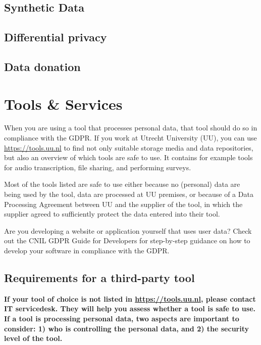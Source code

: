 \documentclass[
]{book}
\begin{document}
\hypertarget{synthetic-data}{%
\section{Synthetic Data}\label{synthetic-data}}

\hypertarget{differential-privacy}{%
\section{Differential privacy}\label{differential-privacy}}

\hypertarget{data-donation}{%
\section{Data donation}\label{data-donation}}

\hypertarget{tools-and-services}{%
\chapter{Tools \& Services}\label{tools-and-services}}

When you are using a tool that processes personal data, that tool should do so
in compliance with the GDPR. If you work at Utrecht University (UU), you can use
\url{https://tools.uu.nl} to find not only suitable
storage media
and data repositories,
but also an
overview of which tools are safe to use.
It contains for example tools for audio transcription, file sharing, and performing
surveys.

Most of the tools listed are safe to use either because no (personal)
data are being used by the tool, data are processed at UU premises, or because
of a Data Processing Agreement between
UU and the supplier of the tool, in which the supplier agreed to
sufficiently protect the data entered into their tool.

Are you developing a website or application yourself that uses user data? Check
out the CNIL GDPR Guide for Developers
for step-by-step guidance on how to develop your software in compliance with the GDPR.

\hypertarget{tool-requirements}{%
\section{Requirements for a third-party tool}\label{tool-requirements}}

\textbf{If your tool of choice is not listed in \url{https://tools.uu.nl}, please contact
IT servicedesk. They will help you assess
whether a tool is safe to use. If a tool is processing personal data, two aspects
are important to consider: 1) who is controlling the personal data, and 2) the
security level of the tool.}
\end{document}

